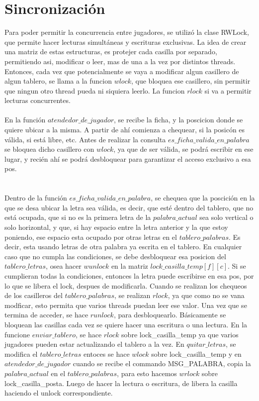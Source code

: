 \section{Sincronización}
Para poder permitir la concurrencia entre jugadores, se utilizó la clase RWLock, que permite hacer lecturas simultáneas y escrituras exclusivas.
La idea de crear una matriz de estas estructuras, es protejer cada casilla por separado, permitiendo asi, modificar o leer, mas de una a la vez por distintos
threads.
\\
Entonces, cada vez que potencialmente se vaya a modificar algun casillero de algun tablero, se llama a la funcion $wlock$, que bloquea ese casillero,
sin permitir que ningun otro thread pueda ni siquiera leerlo. La funcion $rlock$ si va a permitir lecturas concurrentes.
\\
\\
En la función $atendedor\_de\_jugador$, se recibe la ficha, y la poscicion donde se quiere ubicar a la misma. A partir de ahí comienza a chequear,
si la posicón es válida, si está libre, etc.
Antes de realizar la consulta $es\_ficha\_valida\_en\_palabra$ se bloquea dicho casillero con $wlock$, ya que de ser válida, se podrá escribir en ese lugar, y
recién ahí se podrá desbloquear para garantizar el acceso exclusivo a esa pos.
\\
\\
\\


Dentro de la función $es\_ficha\_valida\_en\_palabra$, se chequea que la poscición en la que se desa ubicar la letra sea válida, es decir, que esté dentro
del tablero, que no está ocupada, que si no es la primera letra de la $palabra\_actual$ sea solo vertical o solo horizontal, y que, si hay espacio entre
la letra anterior y la que estoy poniendo, ese espacio esta ocupado por otras letras en el $tablero\_palabras$. Es decir, esta usando letras de otra palabra ya
escrita en el tablero. 
En cualquier caso que no cumpla las condiciones, se debe desbloquear esa posicion del $tablero\_letras$, osea hacer $wunlock$ en la matriz $lock\_casilla\_temp[f][c]$.
Si se cumplieran todas la condiciones, entonces la letra puede escribirse en esa pos, por lo que se libera el lock, despues de modificarla.
Cuando se realizan los chequeos de los casilleros del $tablero\_palabras$, se realizan $rlock$, ya que como no se vana  modficar, esto permita que varios threads
puedan leer ese valor. Una vez que se termina de acceder, se hace $runlock$, para desbloquearlo.
Básicamente se bloquean las casillas cada vez se quiere hacer una escritura o una lectura.
En la funcione $enviar\_tablero$, se hace $rlock$ sobre lock\_casilla\_temp ya que varios jugadores pueden estar actualizando el tablero a la vez.
En $quitar\_letras$, se modifica el $tablero\_letras$ entoces se hace $wlock$ sobre lock\_casilla\_temp y en $atendedor\_de\_jugador$ cuando se recibe el commando MSG\_PALABRA, copia la $palabra\_actual$ en el 
$tablero\_palabras$, para esto hacemos $wrlock$ sobre lock\_casilla\_posta. Luego de hacer la lectura o escritura, de libera la casilla haciendo el unlock correspondiente.


